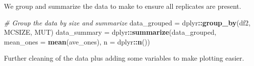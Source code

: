\documentclass[]{book}
\newenvironment{Shaded}{\begin{snugshade}}{\end{snugshade}}
\newcommand{\CommentTok}[1]{\textcolor[rgb]{0.56,0.35,0.01}{\textit{#1}}}
\newcommand{\DataTypeTok}[1]{\textcolor[rgb]{0.13,0.29,0.53}{#1}}
\newcommand{\KeywordTok}[1]{\textcolor[rgb]{0.13,0.29,0.53}{\textbf{#1}}}
\newcommand{\NormalTok}[1]{#1}
\newcommand{\OperatorTok}[1]{\textcolor[rgb]{0.81,0.36,0.00}{\textbf{#1}}}
\newcommand{\StringTok}[1]{\textcolor[rgb]{0.31,0.60,0.02}{#1}}
\begin{document}
We group and summarize the data to make to ensure all replicates are present.

\begin{Shaded}
\begin{Highlighting}[]
\CommentTok{# Group the data by size and summarize}
\NormalTok{data_grouped =}\StringTok{ }\NormalTok{dplyr}\OperatorTok{::}\KeywordTok{group_by}\NormalTok{(df2, MCSIZE, MUT)}
\NormalTok{data_summary =}\StringTok{ }\NormalTok{dplyr}\OperatorTok{::}\KeywordTok{summarize}\NormalTok{(data_grouped, }\DataTypeTok{mean_ones =} \KeywordTok{mean}\NormalTok{(ave_ones), }\DataTypeTok{n =}\NormalTok{ dplyr}\OperatorTok{::}\KeywordTok{n}\NormalTok{())}
\end{Highlighting}
\end{Shaded}

Further cleaning of the data plus adding some variables to make plotting easier.
\end{document}
